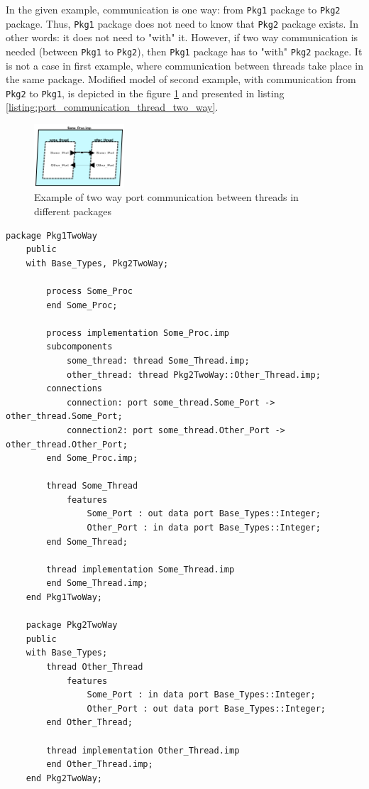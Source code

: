 In the given example, communication is one way: from \lstinline{Pkg1} package to \lstinline{Pkg2} package. Thus, \lstinline{Pkg1} package does not need to know that \lstinline{Pkg2} package exists. In other words: it does not need to "with" it. However, if two way communication is needed (between \lstinline{Pkg1} to \lstinline{Pkg2}), then \lstinline{Pkg1} package has to "with" \lstinline{Pkg2} package. It is not a case in first example, where communication between threads take place in the same package. Modified model of second example, with communication from \lstinline{Pkg2} to \lstinline{Pkg1}, is depicted in the figure \ref{figure:port_communication_thread_two_way} and presented in listing \ref{listing:port_communication_thread_two_way}. 

\begin{figure}[ht]%
    \begin{center}
    	\includegraphics[width=0.3\textwidth]{figures/port-communication-thread-two-way.png}    	
    \end{center}
    \caption{Example of two way port communication between threads in different packages}
    \label{figure:port_communication_thread_two_way}
\end{figure}

\singlespacing
\begin{lstlisting}[language=aadl, frame=single, gobble=0, caption={AADL model of two way port communication threads in different packages}, label={listing:port_communication_thread_two_way}]
	package Pkg1TwoWay
	public
	with Base_Types, Pkg2TwoWay;

		process Some_Proc
		end Some_Proc;
		
		process implementation Some_Proc.imp
		subcomponents
			some_thread: thread Some_Thread.imp;
			other_thread: thread Pkg2TwoWay::Other_Thread.imp;
		connections
			connection: port some_thread.Some_Port -> other_thread.Some_Port;
			connection2: port some_thread.Other_Port -> other_thread.Other_Port;
		end Some_Proc.imp;

		thread Some_Thread
			features
				Some_Port : out data port Base_Types::Integer;
				Other_Port : in data port Base_Types::Integer;
		end Some_Thread;

		thread implementation Some_Thread.imp
		end Some_Thread.imp;	
	end Pkg1TwoWay;

	package Pkg2TwoWay
	public
	with Base_Types;
		thread Other_Thread
			features
				Some_Port : in data port Base_Types::Integer;
				Other_Port : out data port Base_Types::Integer;
		end Other_Thread;

		thread implementation Other_Thread.imp
		end Other_Thread.imp;
	end Pkg2TwoWay;
\end{lstlisting} 
\doublespacing

